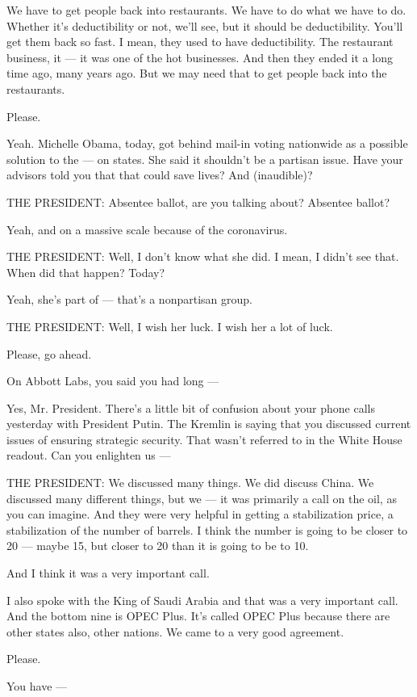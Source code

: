 We have to get people back into restaurants. We have to do what we have
to do. Whether it's deductibility or not, we'll see, but it should be
deductibility. You'll get them back so fast. I mean, they used to have
deductibility. The restaurant business, it --- it was one of the hot
businesses. And then they ended it a long time ago, many years ago. But
we may need that to get people back into the restaurants.

Please.

Yeah. Michelle Obama, today, got behind mail-in voting nationwide as a
possible solution to the --- on states. She said it shouldn't be a
partisan issue. Have your advisors told you that that could save lives?
And (inaudible)?

THE PRESIDENT: Absentee ballot, are you talking about? Absentee ballot?

Yeah, and on a massive scale because of the coronavirus.

THE PRESIDENT: Well, I don't know what she did. I mean, I didn't see
that. When did that happen? Today?

Yeah, she's part of --- that's a nonpartisan group.

THE PRESIDENT: Well, I wish her luck. I wish her a lot of luck.

Please, go ahead.

On Abbott Labs, you said you had long ---

Yes, Mr. President. There's a little bit of confusion about your phone
calls yesterday with President Putin. The Kremlin is saying that you
discussed current issues of ensuring strategic security. That wasn't
referred to in the White House readout. Can you enlighten us ---

THE PRESIDENT: We discussed many things. We did discuss China. We
discussed many different things, but we --- it was primarily a call on
the oil, as you can imagine. And they were very helpful in getting a
stabilization price, a stabilization of the number of barrels. I think
the number is going to be closer to 20 --- maybe 15, but closer to 20
than it is going to be to 10.

And I think it was a very important call.

I also spoke with the King of Saudi Arabia and that was a very important
call. And the bottom nine is OPEC Plus. It's called OPEC Plus because
there are other states also, other nations. We came to a very good
agreement.

Please.

You have ---

